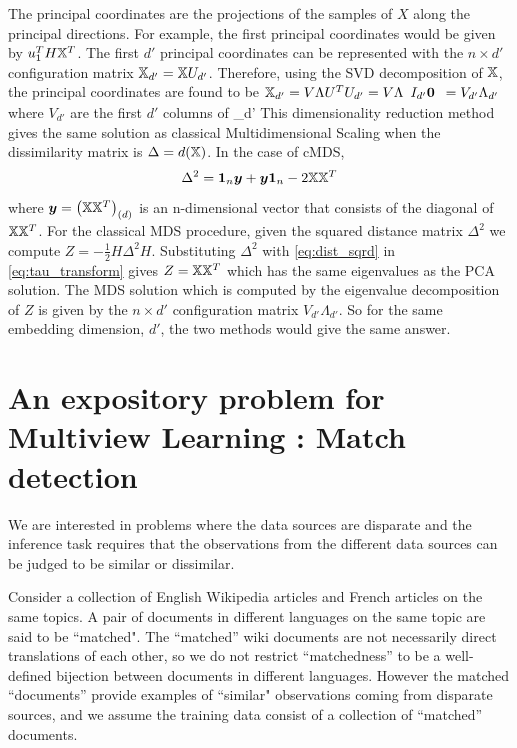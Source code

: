 \documentclass[12pt,oneside,final]{thesis}\usepackage[]{graphicx}\usepackage[]{color}
\begin{document}
The principal coordinates are the projections of the samples of $X$ along the principal directions. For example, the first principal coordinates would be given by $u_1^T H {\mathbb{X}}^T$. The  first $d'$ principal coordinates can be represented with the $n \times d'$ configuration matrix $\mathbb{X}_{d'} =  {\mathbb{X}}  U_{d'}$. Therefore, using the SVD decomposition of $\mathbb{X}$,  the principal coordinates are found to be  $\mathbb{X}_{d'}= V \Lambda U^T U_{d'} = V  \Lambda \begin{array}{c}
I_{d'}
\bm{0}
\end{array}= V_{d'} \Lambda_{d'} $ where   $V_{d'}$ are the first $d'$ columns  of   \Lambda_{d'}
This dimensionality reduction method gives the same solution as classical Multidimensional Scaling when the dissimilarity matrix is $\Delta =d(\mathbb{X})$. In the case of cMDS, $$\Delta^2=  \mbox{{\bf 1}}_n \bm{y} +\bm{y} \mbox{{\bf 1}}_n -2 \mathbb{X} \mathbb{X}^T \label{eq:dist_sqrd}$$ where $\bm{y}= \left(\mathbb{X}\mathbb{X}^T \right)_{(d)}$ is an n-dimensional vector that consists of  the diagonal of $\mathbb{X}\mathbb{X}^T$.
For the classical MDS procedure, given the squared distance matrix $\Delta^2$ we compute $Z=  - \frac{1}{2} H\Delta^2 H \label{eq:tau_transform}$. Substituting $\Delta^2$ with \eqref{eq:dist_sqrd}   in \eqref{eq:tau_transform} gives $ Z= \mathbb{X}\mathbb{X}^T$ which has the same eigenvalues as the PCA solution. The MDS solution which is computed by the eigenvalue decomposition of $Z$ is given by the $n \times d'$ configuration matrix  $V_{d'} \Lambda_{d'}$. So for the same embedding dimension, $d'$, the two methods would give the same answer.





\chapter{An expository problem for Multiview Learning : Match detection}
\label{chap:match_detection}

 We are interested in problems where the data sources are disparate and the inference task requires that the observations from  the different data sources  can be judged to be similar or dissimilar.
  
	Consider a collection of  English Wikipedia articles  and   French articles on the same topics. A pair of documents in different languages on the same topic are said to be ``matched". The ``matched'' wiki documents are  not necessarily direct translations of each other, so  we do not restrict ``matchedness'' to be a well-defined bijection between documents in different languages.
	However the matched ``documents''  provide examples of  ``similar"  observations coming from disparate sources, and we assume the training data consist of  a collection of ``matched'' documents.
	
\end{document}
